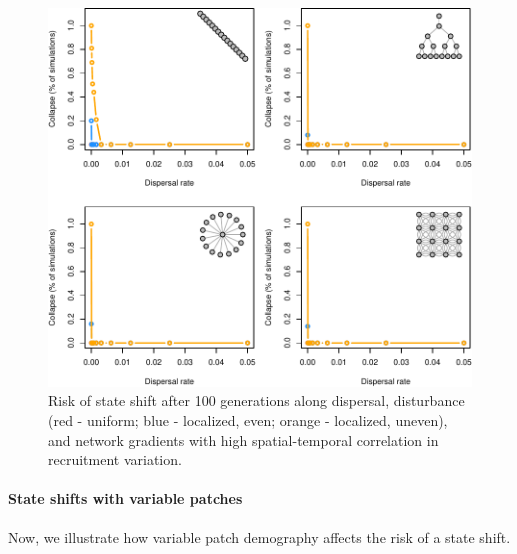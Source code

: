 \documentclass[
]{article}
\begin{document}
\begin{figure}[H]

{\centering \includegraphics{Managing_for_ecological_surprises_in_metapopulations_files/figure-latex/collapsed-1} 

}

\caption{Risk of state shift after 100 generations along dispersal, disturbance (red - uniform; blue - localized, even; orange - localized, uneven), and network gradients with high spatial-temporal correlation in recruitment variation.}\label{fig:collapsed}
\end{figure}
\newpage

\hypertarget{state-shifts-with-variable-patches}{%
\paragraph{State shifts with variable
patches}\label{state-shifts-with-variable-patches}}

Now, we illustrate how variable patch demography affects the risk of a
state shift.
\end{document}
